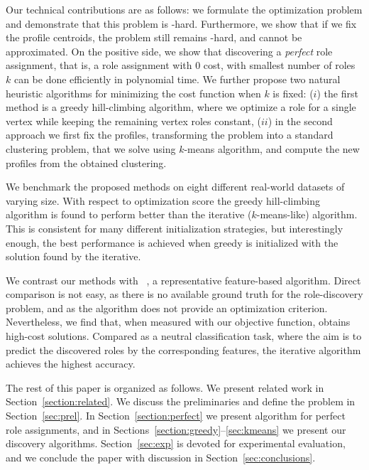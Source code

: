 \smallskip
Our technical contributions are as follows: we formulate the optimization
problem and demonstrate that this problem is \np-hard. Furthermore, we show
that if we fix the profile centroids, 
the problem still remains \np-hard, and 
cannot be approximated.
On the positive side, we show that discovering a \emph{perfect}
role assignment, that is, a role assignment with $0$ cost, with smallest number
of roles $k$ can be done efficiently in polynomial time. We further propose two
natural heuristic algorithms for minimizing the cost function when $k$ is fixed: 
($i$) the first method is
a greedy hill-climbing algorithm, where we optimize a role for a single
vertex while keeping the remaining vertex roles constant,
($ii$) in the second approach we first fix the profiles, transforming
the problem into a standard clustering problem, that we solve using $k$-means algorithm,
and compute the new profiles from the obtained clustering.

\smallskip
We benchmark the proposed methods
on eight different real-world datasets of varying size.
With respect to optimization score
the greedy hill-climbing algorithm is found to perform better 
than the iterative ($k$-means-like) algorithm.
This is consistent for many different initialization strategies, 
but interestingly enough, 
the best performance is achieved when greedy is initialized with the solution found by the iterative.

We contrast our methods with
\algrolx~\cite{henderson2012rolx}, 
a representative feature-based algorithm.
Direct comparison is not easy, 
as there is no available ground truth for the role-discovery problem, 
and as the \algrolx algorithm does not provide an optimization criterion.
Nevertheless, we find that, when measured with our objective function, 
\algrolx obtains high-cost solutions.
Compared as a neutral classification task,
where the aim is to predict the discovered roles by the corresponding features, 
the iterative algorithm achieves the highest accuracy.

\smallskip
The rest of this paper is organized as follows.
We present related work in Section~\ref{section:related}.
We discuss the preliminaries and define the problem in Section~\ref{sec:prel}.
In Section~\ref{section:perfect} we present algorithm for perfect role assignments,
and in Sections~\ref{section:greedy}--\ref{sec:kmeans} we present our discovery algorithms.
Section~\ref{sec:exp} is devoted for experimental evaluation, and we conclude the paper with discussion in Section~\ref{sec:conclusions}.







